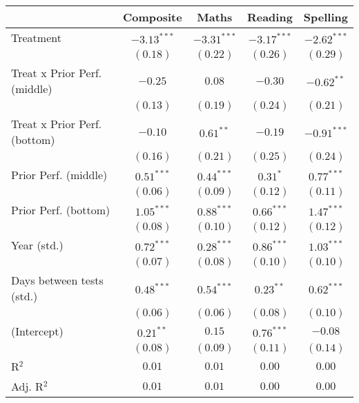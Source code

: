 
\begin{table}
\begin{center}
\begin{tabular}{l c c c c}
\hline
 & Composite & Maths & Reading & Spelling \\
\hline
Treatment                    & $-3.13^{***}$ & $-3.31^{***}$ & $-3.17^{***}$ & $-2.62^{***}$ \\
                             & $(0.18)$      & $(0.22)$      & $(0.26)$      & $(0.29)$      \\
Treat x Prior Perf. (middle) & $-0.25$       & $0.08$        & $-0.30$       & $-0.62^{**}$  \\
                             & $(0.13)$      & $(0.19)$      & $(0.24)$      & $(0.21)$      \\
Treat x Prior Perf. (bottom) & $-0.10$       & $0.61^{**}$   & $-0.19$       & $-0.91^{***}$ \\
                             & $(0.16)$      & $(0.21)$      & $(0.25)$      & $(0.24)$      \\
Prior Perf. (middle)         & $0.51^{***}$  & $0.44^{***}$  & $0.31^{*}$    & $0.77^{***}$  \\
                             & $(0.06)$      & $(0.09)$      & $(0.12)$      & $(0.11)$      \\
Prior Perf. (bottom)         & $1.05^{***}$  & $0.88^{***}$  & $0.66^{***}$  & $1.47^{***}$  \\
                             & $(0.08)$      & $(0.10)$      & $(0.12)$      & $(0.12)$      \\
Year (std.)                  & $0.72^{***}$  & $0.28^{***}$  & $0.86^{***}$  & $1.03^{***}$  \\
                             & $(0.07)$      & $(0.08)$      & $(0.10)$      & $(0.10)$      \\
Days between tests (std.)    & $0.48^{***}$  & $0.54^{***}$  & $0.23^{**}$   & $0.62^{***}$  \\
                             & $(0.06)$      & $(0.06)$      & $(0.08)$      & $(0.10)$      \\
(Intercept)                  & $0.21^{**}$   & $0.15$        & $0.76^{***}$  & $-0.08$       \\
                             & $(0.08)$      & $(0.09)$      & $(0.11)$      & $(0.14)$      \\
\hline
R$^2$                        & $0.01$        & $0.01$        & $0.00$        & $0.00$        \\
Adj. R$^2$                   & $0.01$        & $0.01$        & $0.00$        & $0.00$        \\

\end{tabular}
\end{center}
\end{table}
